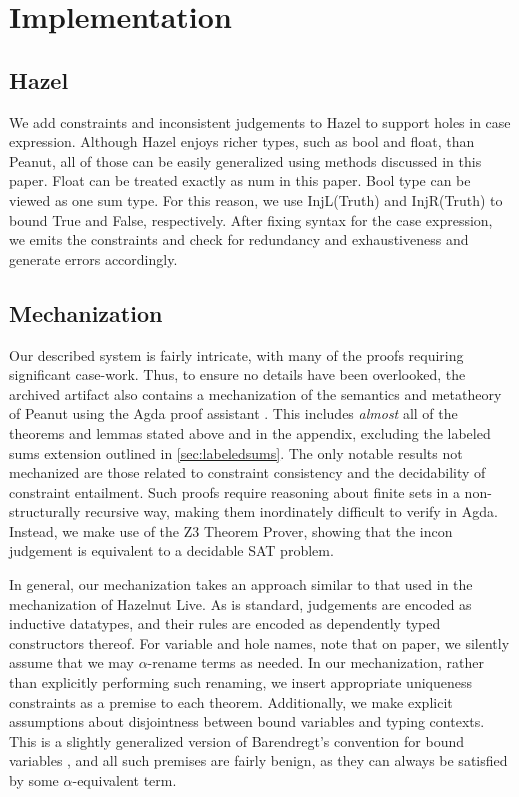 \section{Implementation}
\subsection{Hazel}
We add constraints and inconsistent judgements to Hazel to support holes in case expression. Although Hazel enjoys richer types, such as bool and float, than Peanut, all of those can be easily generalized using methods discussed in this paper. Float can be treated exactly as num in this paper. Bool type can be viewed as one sum type. For this reason, we use InjL(Truth) and InjR(Truth) to bound True and False, respectively. After fixing syntax for the case expression, we emits the constraints and check for redundancy and exhaustiveness and generate errors accordingly.

\subsection{Mechanization}
Our described system is fairly intricate, with many of the proofs requiring significant case-work. Thus, to ensure no details have been overlooked, the archived artifact also contains a mechanization of the semantics and metatheory of Peanut using the Agda proof assistant . This includes \emph{almost} all of the theorems and lemmas stated above and in the appendix, excluding the labeled sums extension outlined in \autoref{sec:labeledsums}. The only notable results not mechanized are those related to constraint consistency and the decidability of constraint entailment. Such proofs require reasoning about finite sets in a non-structurally recursive way, making them inordinately difficult to verify in Agda. Instead, we make use of the Z3 Theorem Prover,  showing that the incon judgement is equivalent to a decidable SAT problem.

In general, our mechanization takes an approach similar to that used in the mechanization of Hazelnut Live. As is standard, judgements are encoded as inductive datatypes, and their rules are encoded as dependently typed constructors thereof. For variable and hole names, note that on paper, we silently assume that we may $\alpha$-rename terms as needed. In our mechanization, rather than explicitly performing such renaming, we insert appropriate uniqueness constraints as a premise to each theorem. Additionally, we make explicit assumptions about disjointness between bound variables and typing contexts. This is a slightly generalized version of Barendregt’s convention for bound variables , and all such premises are fairly benign, as they can always be satisfied by some $\alpha$-equivalent term.

